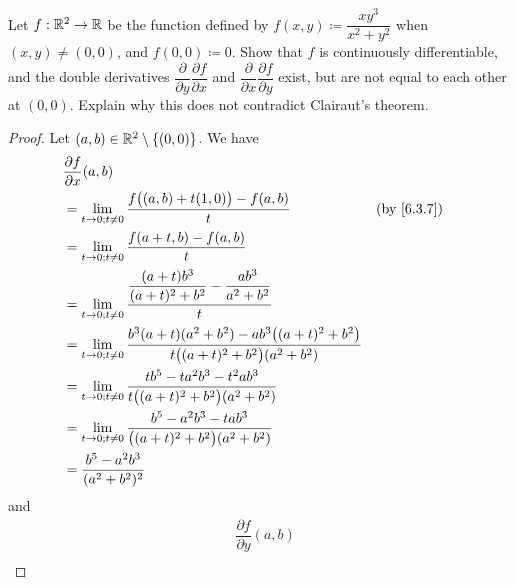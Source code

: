 \exercisesection

\begin{ex}\label{ex:6.5.1}
  Let \(f : \mathbb{R}^2 \to \mathbb{R}\) be the function defined by \(f(x, y) \coloneqq \dfrac{x y^3}{x^2 + y^2}\) when \((x, y) \neq (0, 0)\), and \(f(0, 0) \coloneqq 0\).
  Show that \(f\) is continuously differentiable, and the double derivatives \(\dfrac{\partial}{\partial y} \dfrac{\partial f}{\partial x}\) and \(\dfrac{\partial}{\partial x} \dfrac{\partial f}{\partial y}\) exist, but are not equal to each other at \((0, 0)\).
  Explain why this does not contradict Clairaut's theorem.
\end{ex}

\begin{proof}
  Let \((a, b) \in \mathbb{R}^2 \setminus \{(0, 0)\}\).
  We have
  \begin{align*}
     & \dfrac{\partial f}{\partial x}(a, b)                                                                                                                   \\
     & = \lim_{t \to 0 ; t \neq 0} \dfrac{f\big((a, b) + t(1, 0)\big) - f(a, b)}{t}                                                           &  & \by{6.3.7} \\
     & = \lim_{t \to 0 ; t \neq 0} \dfrac{f(a + t, b) - f(a, b)}{t}                                                                                           \\
     & = \lim_{t \to 0 ; t \neq 0} \dfrac{\dfrac{(a + t) b^3}{(a + t)^2 + b^2} - \dfrac{ab^3}{a^2 + b^2}}{t}                                                  \\
     & = \lim_{t \to 0 ; t \neq 0} \dfrac{b^3 (a + t) (a^2 + b^2) - a b^3 \big((a + t)^2 + b^2\big)}{t \big((a + t)^2 + b^2\big) (a^2 + b^2)}                 \\
     & = \lim_{t \to 0 ; t \neq 0} \dfrac{t b^5 - t a^2 b^3 - t^2 a b^3}{t \big((a + t)^2 + b^2\big) (a^2 + b^2)}                                             \\
     & = \lim_{t \to 0 ; t \neq 0} \dfrac{b^5 - a^2 b^3 - t a b^3}{\big((a + t)^2 + b^2\big) (a^2 + b^2)}                                                     \\
     & = \dfrac{b^5 - a^2 b^3}{(a^2 + b^2)^2}
  \end{align*}
  and
  \begin{align*}
     & \dfrac{\partial f}{\partial y}(a, b)                                                                                                                     \\

\end{align*}
\end{proof}

